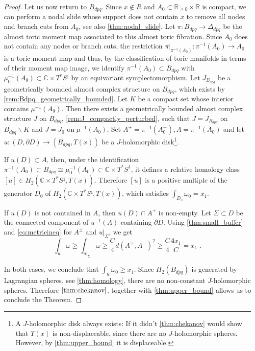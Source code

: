 \documentclass[12pt,a4paper,draft]{scrartcl}
\begin{document}
\begin{proof}
  Let us now return to $B_{dpq}$. Since $x \notin R$ and $A_0 \subset \mathbb{R}_{\geqslant 0} \times \mathbb{R}$ is compact, we can perform a nodal slide whose support does not contain $x$ to remove all nodes and branch cuts from $A_0$, see also \cref{thm:nodal_slide}. Let $\pi \colon B_{dpq} \rightarrow \Delta_{dpq}$ be the almost toric moment map associated to this almost toric fibration. Since $A_0$ does not contain any nodes or branch cuts, the restriction $\pi\vert_{\pi^{-1}(A_0)} \colon \pi^{-1}(A_0) \rightarrow A_0$ is a toric moment map and thus, by the classification of toric manifolds in terms of their moment map image, we identify $\pi^{-1}(A_0) ⊂ B_{dpq}$ with $μ_0^{-1}(A_0) ⊂ ℂ × T^* S¹$ by an equivariant symplectomorphism.
  Let $J_{B_{dpq}}$ be a geometrically bounded almost complex structure on $B_{dpq}$, which exists by \cref{rem:Bdpq_geometrically_bounded}.
  Let $K$ be a compact set whose interior contains $μ^{-1}(A_0)$. Then there exists a geometrically bounded almost complex structure $J$ on $B_{dpq}$, \cref{rem:J_compactly_perturbed}, such that $J=J_{B_{dpq}}$ on $B_{dpq} ∖ K$ and $J=J_0$ on $μ^{-1}(A_0)$. Set $A^± = \pi^{-1}(A_0^±), A = \pi^{-1}(A_0)$ and let $u\colon (D,∂D) → (B_{dpq}, T(x))$ be a $J$-holomorphic disk\footnote{A $J$-holomorphic disk always exists: If it didn't \cref{thm:chekanov} would show that $T(x)$ is non-displaceable, since there are no $J$-holomorphic spheres. However, by \cref{thm:upper_bound} it is displaceable.}. 
  
  If $u(D) ⊂ A$, then, under the identification $\pi^{-1}(A_0) ⊂ B_{dpq} \cong μ_0^{-1}(A_0) \subset \mathbb{C} \times T^*S^1$, it defines a relative homology class $[u] ∈ H_2(ℂ × T^*S¹, T(x))$. Therefore $[u]$ is a positive multiple of the generator $D_0$ of $H_2(ℂ × T^*S¹, T(x))$, which satisfies $∫_{D_0} ω_0 = x_1$.
  
  If $u(D)$ is not contained in $A$, then $u(D) ∩ A^+$ is non-empty.
Let $Σ ⊂ D$ be the connected component of $u^{-1}(A)$ containing $∂D$. Using \cref{thm:small_buffer} and \eqref{eq:metricineq} for $A^±$ and $u|_Σ$, we get
  \[∫_u ω ≥ ∫_{u|_Σ} ω ≥ \frac{C}{4} d(A^+,A^-)^2 ≥ \frac{C}{4} \frac{4x_1}{C} = x_1 \;. \]

    In both cases, we conclude that $∫_{u} ω_0 \geqslant x_1$.
    Since $H_2(B_{dpq})$ is generated by Lagrangian spheres, see \cref{thm:homology}, there are no non-constant $J$-holomorphic spheres. Therefore $\cref{thm:chekanov}$, together with \cref{thm:upper_bound} allows us to conclude the Theorem.
\end{proof}
\end{document}
